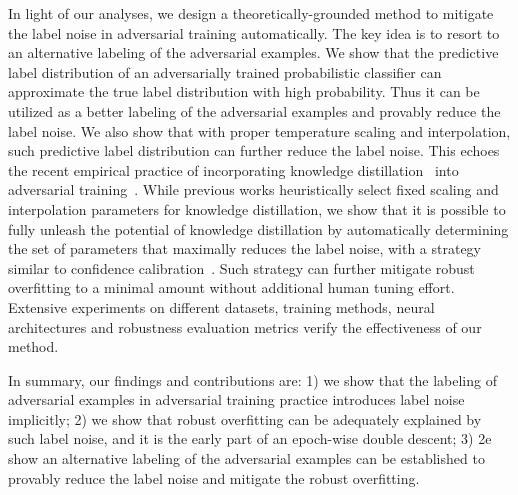 In light of our analyses, we design a theoretically-grounded method to mitigate the label noise in adversarial training automatically.
The key idea is to resort to an alternative labeling of the adversarial examples. 
We show that the predictive label distribution of an adversarially trained probabilistic classifier can approximate the true label distribution with high probability. Thus it can be utilized as a better labeling of the adversarial examples and provably reduce the label noise. We also show that with proper temperature scaling and interpolation, such predictive label distribution can further reduce the label noise.
This echoes the recent empirical practice of incorporating knowledge distillation~\citep{Hinton2015DistillingTK} into adversarial training~\citep{chen2021robust}. 
While previous works heuristically select fixed scaling and interpolation parameters for knowledge distillation, we show that it is possible to fully unleash the potential of knowledge distillation by automatically determining the set of parameters that maximally reduces the label noise, with a strategy similar to confidence calibration~\citep{Guo2017OnCO}. 
Such strategy can further mitigate robust overfitting to a minimal amount without additional human tuning effort.
Extensive experiments on different datasets, training methods, neural architectures and robustness evaluation metrics verify the effectiveness of our method.



In summary, our findings and contributions are: 1) we show that the labeling of adversarial examples in adversarial training practice introduces label noise implicitly; 2) we show that robust overfitting can be adequately explained by such label noise, and it is the early part of an epoch-wise double descent; 3) 2e show an alternative labeling of the adversarial examples can be established to provably reduce the label noise and mitigate the robust overfitting.  

